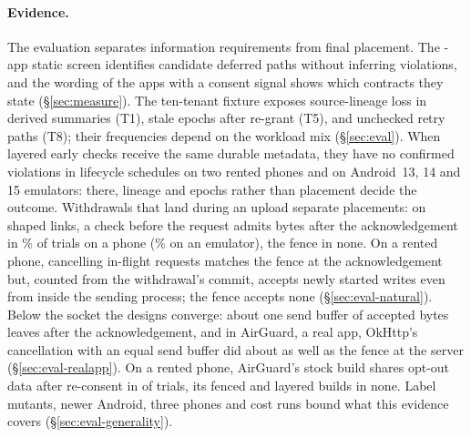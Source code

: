 \paragraph{Evidence.} The evaluation separates information requirements from final placement.
The \corpusN-app static screen identifies candidate deferred paths without inferring violations, and the wording of the
\promiseApps{} apps with a consent signal shows which contracts they state (\S\ref{sec:measure}).
The ten-tenant fixture exposes source-lineage loss in derived summaries (T1), stale epochs after re-grant (T5), and unchecked retry paths (T8); their frequencies depend on the workload mix (\S\ref{sec:eval}).
When layered early checks receive the same durable metadata, they have no confirmed violations in lifecycle schedules on two rented phones and on Android~13, 14 and 15 emulators: there, lineage and epochs rather than placement decide the outcome.
Withdrawals that land during an upload separate placements: on shaped links, a check before the request admits bytes after the acknowledgement in \racePhoneObsPct{}\% of trials on a phone (\raceObsPct{}\% on an emulator), the fence in none. On a rented phone, cancelling in-flight requests matches the fence at the acknowledgement but, counted from the withdrawal's commit, accepts newly started writes even from inside the sending process; the fence accepts none (\S\ref{sec:eval-natural}).
Below the socket the designs converge: about one send buffer of accepted bytes leaves after the acknowledgement, and in AirGuard, a real app, OkHttp's cancellation with an equal send buffer did about as well as the fence at the server (\S\ref{sec:eval-realapp}).
On a rented phone, AirGuard's stock build shares opt-out data after re-consent in \dfAirStockPK{} of \dfAirPKN{} trials, its fenced and layered builds in none.
Label mutants, newer Android, three phones and cost runs bound what this evidence covers (\S\ref{sec:eval-generality}).
